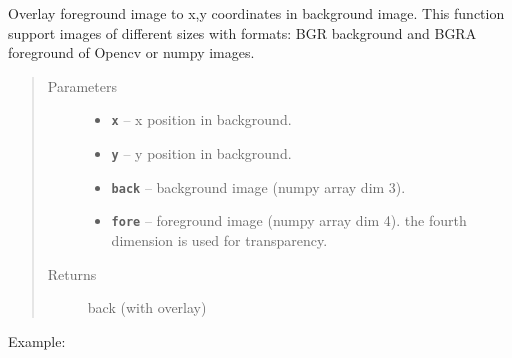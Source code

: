 \documentclass[letterpaper,10pt,english]{sphinxmanual}
\begin{document}
\begin{fulllineitems}


{\hyperref[RRtoolbox.lib.arrayops:RRtoolbox.lib.arrayops.basic.overlay]{\emph{}}}



\end{fulllineitems}


\begin{fulllineitems}
\label{RRtoolbox.lib.arrayops:RRtoolbox.lib.arrayops.basic.overlayXY}
Overlay foreground image to x,y coordinates in background image.
This function support images of different sizes with formats: BGR background
and BGRA foreground of Opencv or numpy images.
\begin{quote}\begin{description}
\item[{Parameters}] \leavevmode\begin{itemize}
\item {} 
\textbf{\texttt{x}} -- x position in background.

\item {} 
\textbf{\texttt{y}} -- y position in background.

\item {} 
\textbf{\texttt{back}} -- background image (numpy array dim 3).

\item {} 
\textbf{\texttt{fore}} -- foreground image (numpy array dim 4). the fourth
dimension is used for transparency.

\end{itemize}

\item[{Returns}] \leavevmode
back (with overlay)

\end{description}\end{quote}

Example:


\end{fulllineitems}
\end{document}
